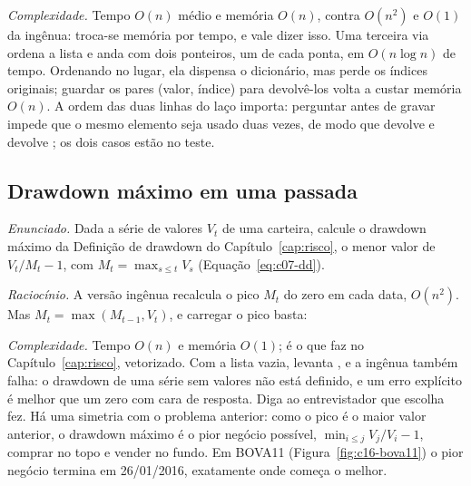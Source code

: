 \emph{Complexidade.} Tempo $O(n)$ médio e memória $O(n)$, contra $O(n^2)$ e $O(1)$ da ingênua: troca-se memória por tempo, e vale dizer isso. Uma terceira via ordena a lista e anda com dois ponteiros, um de cada ponta, em $O(n \log n)$ de tempo. Ordenando no lugar, ela dispensa o dicionário, mas perde os índices originais; guardar os pares (valor, índice) para devolvê-los volta a custar memória $O(n)$. A ordem das duas linhas do laço importa: perguntar antes de gravar impede que o mesmo elemento seja usado duas vezes, de modo que  devolve  e  devolve ; os dois casos estão no teste.

\subsection{Drawdown máximo em uma passada}
\label{sec:c16-drawdown}

\emph{Enunciado.} Dada a série de valores $V_t$ de uma carteira, calcule o drawdown máximo da Definição de drawdown do Capítulo~\ref{cap:risco}, o menor valor de $V_t/M_t - 1$, com $M_t = \max_{s \le t} V_s$ (Equação~\eqref{eq:c07-dd}).

\emph{Raciocínio.} A versão ingênua recalcula o pico $M_t$ do zero em cada data, $O(n^2)$. Mas $M_t = \max(M_{t-1}, V_t)$, e carregar o pico basta:



\emph{Complexidade.} Tempo $O(n)$ e memória $O(1)$; é o que  faz no Capítulo~\ref{cap:risco}, vetorizado. Com a lista vazia,  levanta , e a ingênua também falha: o drawdown de uma série sem valores não está definido, e um erro explícito é melhor que um zero com cara de resposta. Diga ao entrevistador que escolha fez. Há uma simetria com o problema anterior: como o pico é o maior valor anterior, o drawdown máximo é o pior negócio possível, $\min_{i \le j} V_j/V_i - 1$, comprar no topo e vender no fundo. Em BOVA11 (Figura~\ref{fig:c16-bova11}) o pior negócio termina em 26/01/2016, exatamente onde começa o melhor.


